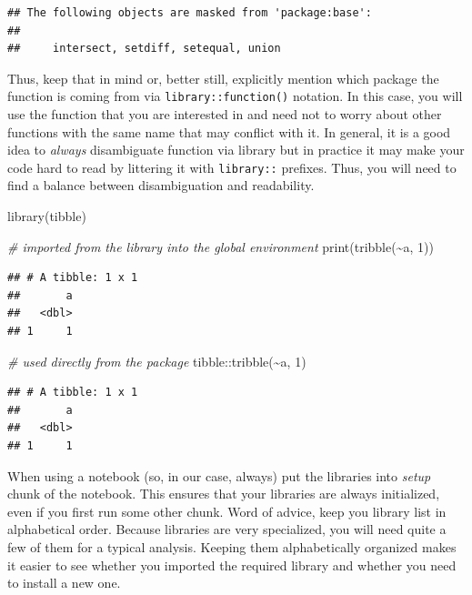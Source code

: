 \documentclass[
]{book}
\newenvironment{Shaded}{\begin{snugshade}}{\end{snugshade}}
\newcommand{\CommentTok}[1]{\textcolor[rgb]{0.56,0.35,0.01}{\textit{#1}}}
\newcommand{\DecValTok}[1]{\textcolor[rgb]{0.00,0.00,0.81}{#1}}
\newcommand{\FunctionTok}[1]{\textcolor[rgb]{0.00,0.00,0.00}{#1}}
\newcommand{\NormalTok}[1]{#1}
\newcommand{\SpecialCharTok}[1]{\textcolor[rgb]{0.00,0.00,0.00}{#1}}
\begin{document}
\begin{verbatim}
## The following objects are masked from 'package:base':
## 
##     intersect, setdiff, setequal, union
\end{verbatim}

Thus, keep that in mind or, better still, explicitly mention which package the function is coming from via \texttt{library::function()} notation. In this case, you will use the function that you are interested in and need not to worry about other functions with the same name that may conflict with it. In general, it is a good idea to \emph{always} disambiguate function via library but in practice it may make your code hard to read by littering it with \texttt{library::} prefixes. Thus, you will need to find a balance between disambiguation and readability.

\begin{Shaded}
\begin{Highlighting}[]
\FunctionTok{library}\NormalTok{(tibble)}

\CommentTok{\# imported from the library into the global environment}
\FunctionTok{print}\NormalTok{(}\FunctionTok{tribble}\NormalTok{(}\SpecialCharTok{\textasciitilde{}}\NormalTok{a, }\DecValTok{1}\NormalTok{))}
\end{Highlighting}
\end{Shaded}

\begin{verbatim}
## # A tibble: 1 x 1
##       a
##   <dbl>
## 1     1
\end{verbatim}

\begin{Shaded}
\begin{Highlighting}[]
\CommentTok{\# used directly from the package}
\NormalTok{tibble}\SpecialCharTok{::}\FunctionTok{tribble}\NormalTok{(}\SpecialCharTok{\textasciitilde{}}\NormalTok{a, }\DecValTok{1}\NormalTok{)}
\end{Highlighting}
\end{Shaded}

\begin{verbatim}
## # A tibble: 1 x 1
##       a
##   <dbl>
## 1     1
\end{verbatim}

When using a notebook (so, in our case, always) put the libraries into \emph{setup} chunk of the notebook. This ensures that your libraries are always initialized, even if you first run some other chunk. Word of advice, keep you library list in alphabetical order. Because libraries are very specialized, you will need quite a few of them for a typical analysis. Keeping them alphabetically organized makes it easier to see whether you imported the required library and whether you need to install a new one.
\end{document}
